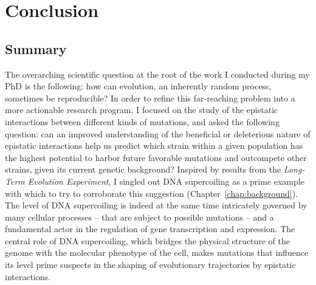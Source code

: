 \chapter{Conclusion}
\label{chap:conclusion}

\section{Summary}

The overarching scientific question at the root of the work I conducted during my PhD is the following: how can evolution, an inherently random process, sometimes be reproducible?
In order to refine this far-reaching problem into a more actionable research program, I focused on the study of the epistatic interactions between different kinds of mutations, and asked the following question: can an improved understanding of the beneficial or deleterious nature of epistatic interactions help us predict which strain within a given population has the highest potential to harbor future favorable mutations and outcompete other strains, given its current genetic background?
Inspired by results from the \emph{Long-Term Evolution Experiment}, I singled out DNA supercoiling as a prime example with which to try to corroborate this suggestion (Chapter~\ref{chap:background}).
The level of DNA supercoiling is indeed at the same time intricately governed by many cellular processes -- that are subject to possible mutations -- and a fundamental actor in the regulation of gene transcription and expression.
The central role of DNA supercoiling, which bridges the physical structure of the genome with the molecular phenotype of the cell, makes mutations that influence its level prime suspects in the shaping of evolutionary trajectories by epistatic interactions.

